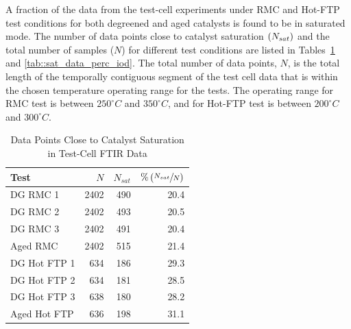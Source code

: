 A fraction of the data from the test-cell experiments under RMC and Hot-FTP test conditions for both degreened and aged
catalysts is found to be in saturated mode. The number of data points close to catalyst saturation $\left( N_{sat} \right)$ and
the total number of samples ($N$) for different test conditions are listed in Tables~\ref{tab::sat_data_perc_ssd} and
\ref{tab::sat_data_perc_iod}. The total number of data points, $N$, is the total length of the temporally contiguous
segment of the test cell data that is within the chosen temperature operating range for the tests. The operating range
for RMC test is between $250^\circ C$ and $350^\circ C$, and for Hot-FTP test is between $200^\circ C$ and $300^\circ
    C$.
\begin{table}[ht]
    \centering
    \caption{Data Points Close to Catalyst Saturation in Test-Cell FTIR Data}
    \label{tab::sat_data_perc_ssd}
    \begin{tabular}{l r r r}
        \hline \hline
        Test         & $N$  & $N_{sat}$ & $\% \left(  \sfrac{N_{sat}}{N}  \right)$ \\\hline \hline
        DG RMC 1     & 2402 & 490       & 20.4                           \\
        DG RMC 2     & 2402 & 493       & 20.5                           \\
        DG RMC 3     & 2402 & 491       & 20.4                           \\
        Aged RMC     & 2402 & 515       & 21.4                           \\ \hline
        DG Hot FTP 1 & 634  & 186       & 29.3                           \\
        DG Hot FTP 2 & 634  & 181       & 28.5                           \\
        DG Hot FTP 3 & 638  & 180       & 28.2                           \\
        Aged Hot FTP & 636  & 198       & 31.1                           \\
        \hline\hline
    \end{tabular}
\end{table}
